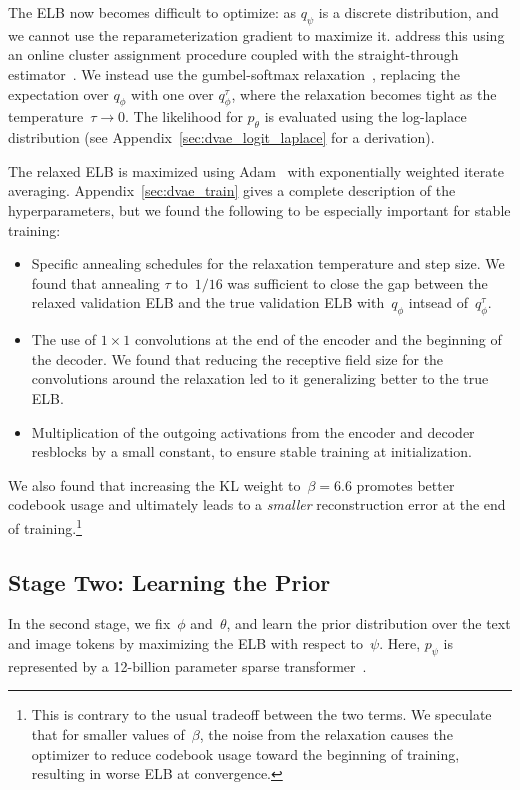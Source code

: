 \documentclass{article}
\begin{document}
The ELB now becomes difficult to optimize: as $q_\psi$ is a discrete distribution, and we cannot use the reparameterization gradient to maximize it. \citet{oord2017neural,razavi2019generating} address this using an online cluster assignment procedure coupled with the straight-through estimator~\cite{bengio2013estimating}. We instead use the gumbel-softmax relaxation~\cite{jang2016categorical,maddison2016concrete}, replacing the expectation over $q_\phi$ with one over $q^\tau_\phi$, where the relaxation becomes tight as the temperature~$\tau \to 0$. The likelihood for $p_\theta$ is evaluated using the log-laplace distribution (see Appendix~\ref{sec:dvae_logit_laplace} for a derivation).







The relaxed ELB is maximized using Adam~\cite{kingma2014adam} with exponentially weighted iterate averaging. Appendix~\ref{sec:dvae_train} gives a complete description of the hyperparameters, but we found the following to be especially important for stable training:
\begin{itemize}
    \item Specific annealing schedules for the relaxation temperature and step size. We found that annealing $\tau$ to~$1 / 16$ was sufficient to close the gap between the relaxed validation ELB and the true validation ELB with~$q_\phi$ intsead of~$q_\phi^\tau$.
    \item The use of $1 \times 1$ convolutions at the end of the encoder and the beginning of the decoder. We found that reducing the receptive field size for the convolutions around the relaxation led to it generalizing better to the true ELB.
    \item Multiplication of the outgoing activations from the encoder and decoder resblocks by a small constant, to ensure stable training at initialization.
\end{itemize}
We also found that increasing the KL weight to~$\beta = 6.6$ promotes better codebook usage and ultimately leads to a \emph{smaller} reconstruction error at the end of training.\footnote{This is contrary to the usual tradeoff between the two terms. We speculate that for smaller values of~$\beta$, the noise from the relaxation causes the optimizer to reduce codebook usage toward the beginning of training, resulting in worse ELB at convergence.}
\subsection{Stage Two: Learning the Prior}
\label{sec:learning_prior}
In the second stage, we fix~$\phi$ and~$\theta$, and learn the prior distribution over the text and image tokens by maximizing the ELB with respect to~$\psi$. Here, $p_\psi$ is represented by a 12-billion parameter sparse transformer~\cite{child2019generating}.
\end{document}
